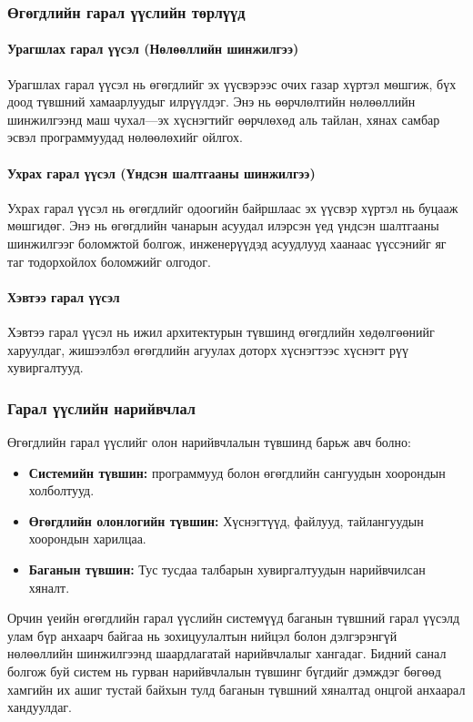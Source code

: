 \subsubsection{Өгөгдлийн гарал үүслийн төрлүүд}

\paragraph{Урагшлах гарал үүсэл (Нөлөөллийн шинжилгээ)}
Урагшлах гарал үүсэл нь өгөгдлийг эх үүсвэрээс очих газар хүртэл мөшгиж, бүх доод түвшний хамаарлуудыг илрүүлдэг. Энэ нь өөрчлөлтийн нөлөөллийн шинжилгээнд маш чухал---эх хүснэгтийг өөрчлөхөд аль тайлан, хянах самбар эсвэл программуудад нөлөөлөхийг ойлгох.

\paragraph{Ухрах гарал үүсэл (Үндсэн шалтгааны шинжилгээ)}
Ухрах гарал үүсэл нь өгөгдлийг одоогийн байршлаас эх үүсвэр хүртэл нь буцааж мөшгидөг. Энэ нь өгөгдлийн чанарын асуудал илэрсэн үед үндсэн шалтгааны шинжилгээг боломжтой болгож, инженерүүдэд асуудлууд хаанаас үүссэнийг яг таг тодорхойлох боломжийг олгодог.

\paragraph{Хэвтээ гарал үүсэл}
Хэвтээ гарал үүсэл нь ижил архитектурын түвшинд өгөгдлийн хөдөлгөөнийг харуулдаг, жишээлбэл өгөгдлийн агуулах доторх хүснэгтээс хүснэгт рүү хувиргалтууд.

\subsubsection{Гарал үүслийн нарийвчлал}

Өгөгдлийн гарал үүслийг олон нарийвчлалын түвшинд барьж авч болно:

\begin{itemize}
    \item \textbf{Системийн түвшин:} программууд болон өгөгдлийн сангуудын хоорондын холболтууд.
    \item \textbf{Өгөгдлийн олонлогийн түвшин:} Хүснэгтүүд, файлууд, тайлангуудын хоорондын харилцаа.
    \item \textbf{Баганын түвшин:} Тус тусдаа талбарын хувиргалтуудын нарийвчилсан хяналт.
\end{itemize}

Орчин үеийн өгөгдлийн гарал үүслийн системүүд баганын түвшний гарал үүсэлд улам бүр анхаарч байгаа нь зохицуулалтын нийцэл болон дэлгэрэнгүй нөлөөллийн шинжилгээнд шаардлагатай нарийвчлалыг хангадаг. Бидний санал болгож буй систем нь гурван нарийвчлалын түвшинг бүгдийг дэмждэг бөгөөд хамгийн их ашиг тустай байхын тулд баганын түвшний хяналтад онцгой анхаарал хандуулдаг.

